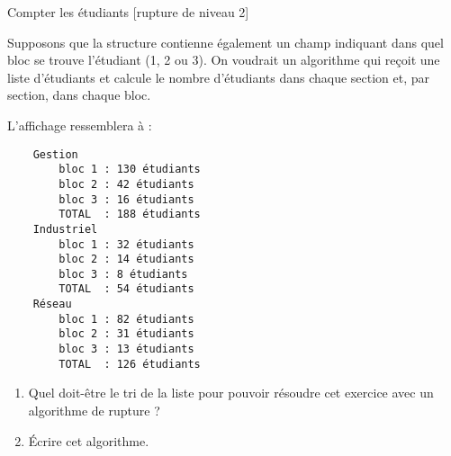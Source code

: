 \begin{Solution}
  \begin{algo}
\end{algo}
\end{Solution}

\begin{Exercice}{Compter les étudiants [rupture de niveau 2]}
	
	Supposons que la structure  contienne également
	un champ indiquant dans quel bloc se trouve l'étudiant (1, 2 ou 3).
	On voudrait un algorithme qui reçoit une liste d'étudiants et calcule
	le nombre d'étudiants dans chaque section et, par section, dans chaque bloc.
	
	L'affichage ressemblera à :
	{\small
	\begin{verbatim}
    Gestion
        bloc 1 : 130 étudiants
        bloc 2 : 42 étudiants
        bloc 3 : 16 étudiants
        TOTAL  : 188 étudiants
    Industriel
        bloc 1 : 32 étudiants
        bloc 2 : 14 étudiants
        bloc 3 : 8 étudiants
        TOTAL  : 54 étudiants
    Réseau
        bloc 1 : 82 étudiants
        bloc 2 : 31 étudiants
        bloc 3 : 13 étudiants
        TOTAL  : 126 étudiants
	\end{verbatim}
	}
	\begin{enumerate}[label=\alph*)]
		\item 
		Quel doit-être le tri de la liste pour pouvoir résoudre cet exercice
		avec un algorithme de rupture ?
		\item 
		Écrire cet algorithme.
	\end{enumerate}
\end{Exercice}

